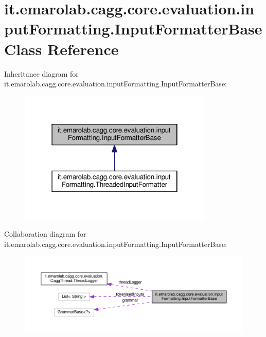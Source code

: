\hypertarget{classit_1_1emarolab_1_1cagg_1_1core_1_1evaluation_1_1inputFormatting_1_1InputFormatterBase}{\section{it.\-emarolab.\-cagg.\-core.\-evaluation.\-input\-Formatting.\-Input\-Formatter\-Base Class Reference}
\label{classit_1_1emarolab_1_1cagg_1_1core_1_1evaluation_1_1inputFormatting_1_1InputFormatterBase}
}


Inheritance diagram for it.\-emarolab.\-cagg.\-core.\-evaluation.\-input\-Formatting.\-Input\-Formatter\-Base\-:\nopagebreak
\begin{figure}[H]
\begin{center}
\leavevmode
\includegraphics[width=262pt]{classit_1_1emarolab_1_1cagg_1_1core_1_1evaluation_1_1inputFormatting_1_1InputFormatterBase__inherit__graph}
\end{center}
\end{figure}


Collaboration diagram for it.\-emarolab.\-cagg.\-core.\-evaluation.\-input\-Formatting.\-Input\-Formatter\-Base\-:\nopagebreak
\begin{figure}[H]
\begin{center}
\leavevmode
\includegraphics[width=350pt]{classit_1_1emarolab_1_1cagg_1_1core_1_1evaluation_1_1inputFormatting_1_1InputFormatterBase__coll__graph}
\end{center}
\end{figure}
